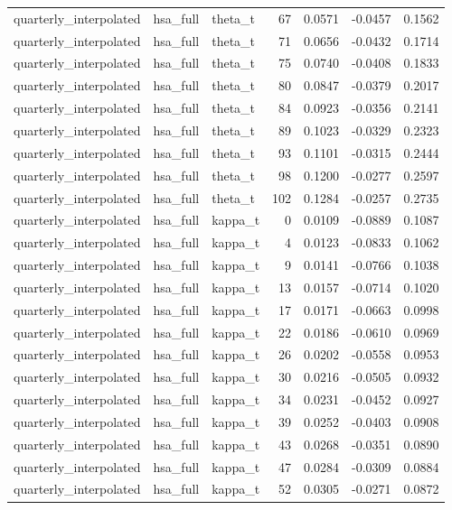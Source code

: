 \begin{tabular}{lllrrrr}
quarterly\_interpolated & hsa\_full & theta\_t & 67 & 0.0571 & -0.0457 & 0.1562 \\
quarterly\_interpolated & hsa\_full & theta\_t & 71 & 0.0656 & -0.0432 & 0.1714 \\
quarterly\_interpolated & hsa\_full & theta\_t & 75 & 0.0740 & -0.0408 & 0.1833 \\
quarterly\_interpolated & hsa\_full & theta\_t & 80 & 0.0847 & -0.0379 & 0.2017 \\
quarterly\_interpolated & hsa\_full & theta\_t & 84 & 0.0923 & -0.0356 & 0.2141 \\
quarterly\_interpolated & hsa\_full & theta\_t & 89 & 0.1023 & -0.0329 & 0.2323 \\
quarterly\_interpolated & hsa\_full & theta\_t & 93 & 0.1101 & -0.0315 & 0.2444 \\
quarterly\_interpolated & hsa\_full & theta\_t & 98 & 0.1200 & -0.0277 & 0.2597 \\
quarterly\_interpolated & hsa\_full & theta\_t & 102 & 0.1284 & -0.0257 & 0.2735 \\
quarterly\_interpolated & hsa\_full & kappa\_t & 0 & 0.0109 & -0.0889 & 0.1087 \\
quarterly\_interpolated & hsa\_full & kappa\_t & 4 & 0.0123 & -0.0833 & 0.1062 \\
quarterly\_interpolated & hsa\_full & kappa\_t & 9 & 0.0141 & -0.0766 & 0.1038 \\
quarterly\_interpolated & hsa\_full & kappa\_t & 13 & 0.0157 & -0.0714 & 0.1020 \\
quarterly\_interpolated & hsa\_full & kappa\_t & 17 & 0.0171 & -0.0663 & 0.0998 \\
quarterly\_interpolated & hsa\_full & kappa\_t & 22 & 0.0186 & -0.0610 & 0.0969 \\
quarterly\_interpolated & hsa\_full & kappa\_t & 26 & 0.0202 & -0.0558 & 0.0953 \\
quarterly\_interpolated & hsa\_full & kappa\_t & 30 & 0.0216 & -0.0505 & 0.0932 \\
quarterly\_interpolated & hsa\_full & kappa\_t & 34 & 0.0231 & -0.0452 & 0.0927 \\
quarterly\_interpolated & hsa\_full & kappa\_t & 39 & 0.0252 & -0.0403 & 0.0908 \\
quarterly\_interpolated & hsa\_full & kappa\_t & 43 & 0.0268 & -0.0351 & 0.0890 \\
quarterly\_interpolated & hsa\_full & kappa\_t & 47 & 0.0284 & -0.0309 & 0.0884 \\
quarterly\_interpolated & hsa\_full & kappa\_t & 52 & 0.0305 & -0.0271 & 0.0872 \\

\end{tabular}
